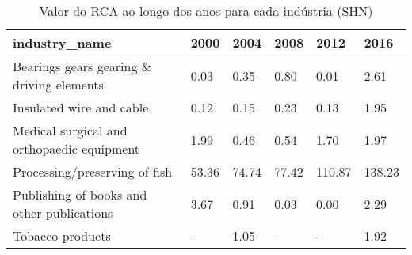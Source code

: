 \begin{table}
\centering
\caption{Valor do RCA ao longo dos anos para cada indústria (SHN)}
\begin{tabular}{p{6cm}p{1.5cm}p{1.5cm}p{1.5cm}p{1.5cm}p{1.5cm}}
\toprule
                             industry\_name &  2000 &  2004 &  2008 &   2012 &   2016 \\
\midrule
 Bearings gears gearing \& driving elements &  0.03 &  0.35 &  0.80 &   0.01 &   2.61 \\
                  Insulated wire and cable &  0.12 &  0.15 &  0.23 &   0.13 &   1.95 \\
Medical surgical and orthopaedic equipment &  1.99 &  0.46 &  0.54 &   1.70 &   1.97 \\
             Processing/preserving of fish & 53.36 & 74.74 & 77.42 & 110.87 & 138.23 \\
Publishing of books and other publications &  3.67 &  0.91 &  0.03 &   0.00 &   2.29 \\
                          Tobacco products &     - &  1.05 &     - &      - &   1.92 \\
\bottomrule
\end{tabular}
\end{table}
